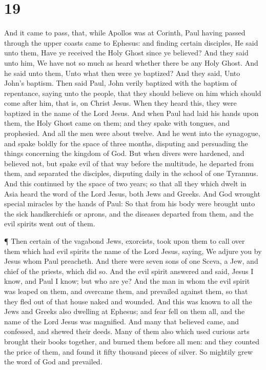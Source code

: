 \hypertarget{section-18}{%
\section{19}\label{section-18}}

 And it came to pass, that, while Apollos was at Corinth,
Paul having passed through the upper coasts came to Ephesus: and finding
certain disciples,  He said unto them, Have ye received the
Holy Ghost since ye believed? And they said unto him, We have not so
much as heard whether there be any Holy Ghost.  And he said
unto them, Unto what then were ye baptized? And they said, Unto John's
baptism.  Then said Paul, John verily baptized with the
baptism of repentance, saying unto the people, that they should believe
on him which should come after him, that is, on Christ Jesus.
 When they heard this, they were baptized in the name of the
Lord Jesus.  And when Paul had laid his hands upon them, the
Holy Ghost came on them; and they spake with tongues, and prophesied.
 And all the men were about twelve.  And he went
into the synagogue, and spake boldly for the space of three months,
disputing and persuading the things concerning the kingdom of God.
 But when divers were hardened, and believed not, but spake
evil of that way before the multitude, he departed from them, and
separated the disciples, disputing daily in the school of one Tyrannus.
 And this continued by the space of two years; so that all
they which dwelt in Asia heard the word of the Lord Jesus, both Jews and
Greeks.  And God wrought special miracles by the hands of
Paul:  So that from his body were brought unto the sick
handkerchiefs or aprons, and the diseases departed from them, and the
evil spirits went out of them.

 ¶ Then certain of the vagabond Jews, exorcists, took upon
them to call over them which had evil spirits the name of the Lord
Jesus, saying, We adjure you by Jesus whom Paul preacheth. 
And there were seven sons of one Sceva, a Jew, and chief of the priests,
which did so.  And the evil spirit answered and said, Jesus
I know, and Paul I know; but who are ye?  And the man in
whom the evil spirit was leaped on them, and overcame them, and
prevailed against them, so that they fled out of that house naked and
wounded.  And this was known to all the Jews and Greeks
also dwelling at Ephesus; and fear fell on them all, and the name of the
Lord Jesus was magnified.  And many that believed came, and
confessed, and shewed their deeds.  Many of them also which
used curious arts brought their books together, and burned them before
all men: and they counted the price of them, and found it fifty thousand
pieces of silver.  So mightily grew the word of God and
prevailed.

